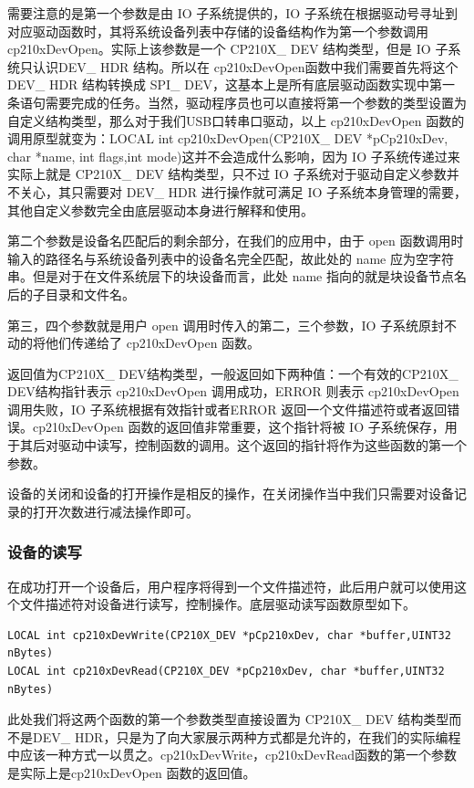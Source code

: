 	需要注意的是第一个参数是由 IO 子系统提供的，IO 子系统在根据驱动号寻址到对应驱动函数时，其将系统设备列表中存储的设备结构作为第一个参数调用 cp210xDevOpen。实际上该参数是一个 CP210X\_ DEV 结构类型，但是 IO 子系统只认识DEV\_ HDR 结构。所以在 cp210xDevOpen函数中我们需要首先将这个 DEV\_ HDR 结构转换成 SPI\_ DEV，这基本上是所有底层驱动函数实现中第一条语句需要完成的任务。当然，驱动程序员也可以直接将第一个参数的类型设置为自定义结构类型，那么对于我们USB口转串口驱动，以上  cp210xDevOpen 函数的调用原型就变为：LOCAL int cp210xDevOpen(CP210X\_ DEV *pCp210xDev, char *name, int flags,int mode)这并不会造成什么影响，因为 IO 子系统传递过来实际上就是 CP210X\_ DEV 结构类型，只不过 IO 子系统对于驱动自定义参数并不关心，其只需要对 DEV\_ HDR 进行操作就可满足 IO 子系统本身管理的需要，其他自定义参数完全由底层驱动本身进行解释和使用。
	
	第二个参数是设备名匹配后的剩余部分，在我们的应用中，由于 open 函数调用时输入的路径名与系统设备列表中的设备名完全匹配，故此处的 name 应为空字符串。但是对于在文件系统层下的块设备而言，此处 name 指向的就是块设备节点名后的子目录和文件名。

	第三，四个参数就是用户 open 调用时传入的第二，三个参数，IO 子系统原封不动的将他们传递给了 cp210xDevOpen 函数。
	
	返回值为CP210X\_ DEV结构类型，一般返回如下两种值：一个有效的CP210X\_ DEV结构指针表示 cp210xDevOpen 调用成功，ERROR 则表示 cp210xDevOpen 调用失败，IO 子系统根据有效指针或者ERROR 返回一个文件描述符或者返回错误。cp210xDevOpen 函数的返回值非常重要，这个指针将被 IO 子系统保存，用于其后对驱动中读写，控制函数的调用。这个返回的指针将作为这些函数的第一个参数。
	
	设备的关闭和设备的打开操作是相反的操作，在关闭操作当中我们只需要对设备记录的打开次数进行减法操作即可。

\subsubsection{设备的读写}
	在成功打开一个设备后，用户程序将得到一个文件描述符，此后用户就可以使用这个文件描述符对设备进行读写，控制操作。底层驱动读写函数原型如下。

\lstset{language=C}
\begin{lstlisting}
LOCAL int cp210xDevWrite(CP210X_DEV *pCp210xDev, char *buffer,UINT32 nBytes)
LOCAL int cp210xDevRead(CP210X_DEV *pCp210xDev, char *buffer,UINT32 nBytes)
\end{lstlisting}

此处我们将这两个函数的第一个参数类型直接设置为 CP210X\_ DEV 结构类型而不是DEV\_ HDR，只是为了向大家展示两种方式都是允许的，在我们的实际编程中应该一种方式一以贯之。cp210xDevWrite，cp210xDevRead函数的第一个参数是实际上是cp210xDevOpen 函数的返回值。

